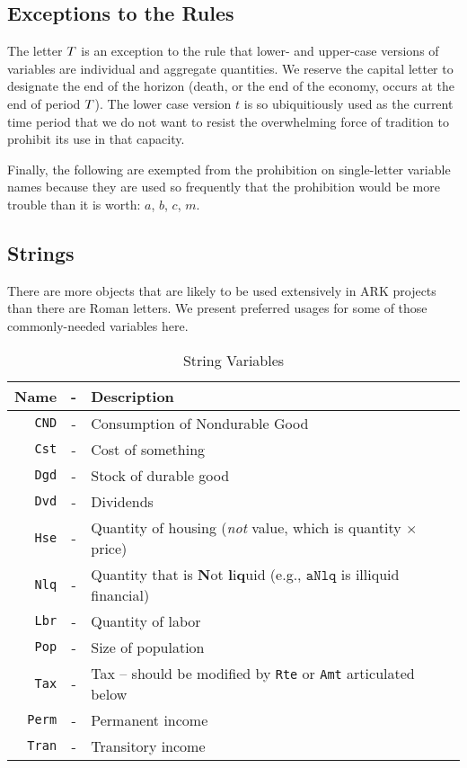 \documentclass[12pt]{econtex}
\begin{document}
\subsection{Exceptions to the Rules}

The letter $T$ is an exception to the rule that lower- and upper-case versions of variables are individual and aggregate quantities.  We reserve the capital letter to designate the end of the horizon (death, or the end of the economy, occurs at the end of period $T$).  The lower case version $t$ is so ubiquitiously used as the current time period that we do not want to resist the overwhelming force of tradition to prohibit its use in that capacity.

Finally, the following are exempted from the prohibition on single-letter variable names because they are used so frequently that the prohibition would be more trouble than it is worth: $a$, $b$, $c$, $m$.  


\pagebreak

\subsection{Strings}

There are more objects that are likely to be used extensively in ARK projects than there are Roman letters.  We present preferred usages for some of those commonly-needed variables here.

\begin{table}[h]
\begin{center}
\begin{tabular}{|rcl|}
\hline
Name & - & Description 
 \\ \hline
     \texttt{CND}    & - & Consumption of Nondurable Good 
 \\  \texttt{Cst}    & - & Cost of something 
 \\  \texttt{Dgd}    & - & Stock of durable good
 \\  \texttt{Dvd}    & - & Dividends 
 \\  \texttt{Hse}    & - & Quantity of housing (\textit{not} value, which is quantity $\times$ price)
 \\  \texttt{Nlq}    & - & Quantity that is \textbf{N}ot \textbf{l}i\textbf{q}uid (e.g., $\mathtt{aNlq}$ is illiquid financial)
 \\  \texttt{Lbr}    & - & Quantity of labor
 \\  \texttt{Pop}    & - & Size of population
 \\  \texttt{Tax} & - & Tax -- should be modified by \texttt{Rte} or \texttt{Amt} articulated below
 \\  \texttt{Perm}   & - & Permanent income
 \\  \texttt{Tran}   & - & Transitory income
\\ \hline
\end{tabular}
\caption{String Variables}
\label{table:Strings}
\end{center}
\end{table}
\end{document}
